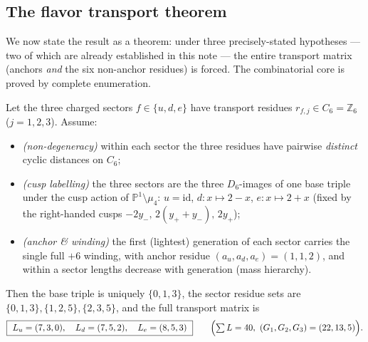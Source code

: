 \subsection{The flavor transport theorem}
We now state the result as a theorem: under three precisely-stated hypotheses --- two of which are
already established in this note --- the entire transport matrix (anchors \emph{and} the six non-anchor
residues) is forced. The combinatorial core is proved by complete enumeration.

\begin{theorem}
\label{thm:flavor}
Let the three charged sectors $f\in\{u,d,e\}$ have transport residues $r_{f,j}\in C_6=\mathbb Z_6$
($j=1,2,3$). Assume:
\begin{itemize}[leftmargin=1.6em]
\item[\textbf{(H1)}] \emph{(non-degeneracy)} within each sector the three residues have pairwise
\emph{distinct} cyclic distances on $C_6$;
\item[\textbf{(H2)}] \emph{(cusp labelling)} the three sectors are the three $D_6$-images of one base
triple under the cusp action of $\mathbb P^1\setminus\mu_4$: $u=\mathrm{id}$, $d:x\mapsto 2{-}x$,
$e:x\mapsto 2{+}x$ (fixed by the right-handed cusps $-2y_-,\,2(y_+{+}y_-),\,2y_+$);
\item[\textbf{(H3)}] \emph{(anchor \& winding)} the first (lightest) generation of each sector carries
the single full $+6$ winding, with anchor residue $(a_u,a_d,a_e)=(1,1,2)$, and within a sector lengths
decrease with generation (mass hierarchy).
\end{itemize}
Then the base triple is uniquely $\{0,1,3\}$, the sector residue sets are
$\{0,1,3\},\{1,2,5\},\{2,3,5\}$, and the full transport matrix is
\begin{equation}
  \boxed{\ L_u=(7,3,0),\quad L_d=(7,5,2),\quad L_e=(8,5,3)\ }\qquad
  \Bigl(\textstyle\sum L=40,\ (G_1,G_2,G_3)=(22,13,5)\Bigr).
\end{equation}
\end{theorem}

